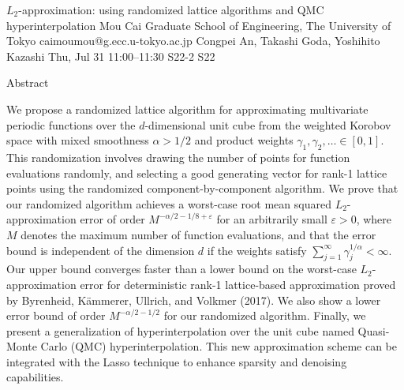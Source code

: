 \begin{talk}
  {$L_2$-approximation: using randomized lattice algorithms and QMC hyperinterpolation}%
  {Mou Cai}%
  {Graduate School of Engineering, The University of Tokyo}%
  {caimoumou@g.ecc.u-tokyo.ac.jp}%
  {Congpei An, Takashi Goda, Yoshihito Kazashi}%
  {}%
  {Thu, Jul 31 11:00--11:30}%
  {S22-2}%
  {S22}%
  
    
Abstract

   
We propose a randomized lattice algorithm for approximating multivariate periodic functions over the $d$-dimensional unit cube from the weighted Korobov space with mixed smoothness $\alpha > 1/2$ and product weights $\gamma_1,\gamma_2,\ldots\in [0,1]$. This randomization involves drawing the number of points for function evaluations randomly, and selecting a good generating vector for rank-1 lattice points using the randomized component-by-component algorithm. We prove that our randomized algorithm achieves a worst-case root mean squared $L_2$-approximation error of order $M^{-\alpha/2 - 1/8 + \varepsilon}$ for an arbitrarily small $\varepsilon > 0$, where $M$ denotes the maximum number of function evaluations, and that the error bound is independent of the dimension $d$ if the weights satisfy $\sum_{j=1}^\infty \gamma_j^{1/\alpha} < \infty$. Our upper bound converges faster than a lower bound on the worst-case $L_2$-approximation error for deterministic rank-1 lattice-based approximation proved by Byrenheid, K\"{a}mmerer, Ullrich, and Volkmer (2017). We also show a lower error bound of order $M^{-\alpha/2-1/2}$ for our randomized algorithm. Finally, we present a generalization of hyperinterpolation over the unit cube named Quasi-Monte Carlo (QMC) hyperinterpolation. This new approximation scheme can be integrated with the Lasso technique to enhance sparsity and denoising capabilities.

\medskip


\end{talk}

